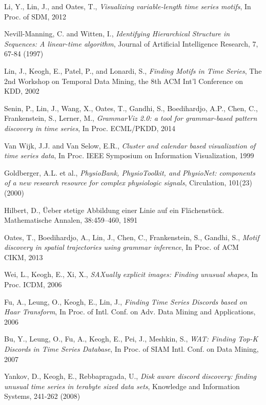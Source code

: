 \begin{thebibliography}{99}
Li, Y., Lin, J., and Oates, T.,
{\em Visualizing variable-length time series motifs},
In Proc. of SDM, 2012

Nevill-Manning, C. and Witten, I.,
{\em Identifying Hierarchical Structure in Sequences: A linear-time algorithm},
Journal of Artificial Intelligence Research, 7, 67-84 (1997)

Lin, J., Keogh, E., Patel, P., and Lonardi, S.,
{\em Finding Motifs in Time Series},
The 2nd Workshop on Temporal Data Mining, the 8th ACM Int'l Conference on KDD, 2002

Senin, P., Lin, J., Wang, X., Oates, T., Gandhi, S., Boedihardjo, A.P., Chen, C., Frankenstein, S., Lerner, M.,
{\em GrammarViz 2.0: a tool for grammar-based pattern discovery in time series},
In Proc. ECML/PKDD, 2014

Van Wijk, J.J. and Van Selow, E.R., 
{\em Cluster and calendar based visualization of time series data},
In Proc. IEEE Symposium on Information Visualization, 1999

Goldberger, A.L. et al., 
{\em PhysioBank, PhysioToolkit, and PhysioNet: components of a new research resource for complex physiologic signals},
Circulation, 101(23) (2000)

Hilbert, D.,
\"{U}eber stetige Abbildung einer Linie auf ein Fl\"{a}chenst\"{u}ck. 
Mathematische Annalen, 38:459--460, 1891

Oates, T., Boedihardjo, A., Lin, J., Chen, C., Frankenstein, S., Gandhi, S.,
{\em Motif discovery in spatial trajectories using grammar inference},
In Proc. of ACM CIKM, 2013

Wei, L., Keogh, E., Xi, X.,
{\em SAXually explicit images: Finding unusual shapes},
In Proc. ICDM, 2006

Fu, A., Leung, O., Keogh, E., Lin, J.,
{\em Finding Time Series Discords based on Haar Transform},
In Proc. of Intl. Conf. on Adv. Data Mining and Applications, 2006

Bu, Y., Leung, O., Fu, A., Keogh, E., Pei, J., Meshkin, S.,
{\em WAT: Finding Top-K Discords in Time Series Database},
In Proc. of SIAM Intl. Conf. on Data Mining, 2007

Yankov, D., Keogh, E., Rebbapragada, U.,
{\em Disk aware discord discovery: finding unusual time series in terabyte sized data sets},
Knowledge and Information Systems, 241-262 (2008)


\end{thebibliography}
